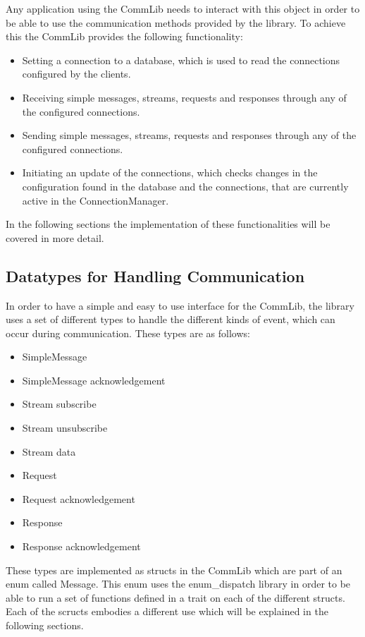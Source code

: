 Any application using the CommLib needs to interact with this object in order to be able to use the communication methods provided by the library. 
To achieve this the CommLib provides the following functionality:

\begin{itemize}
	\item Setting a connection to a database, which is used to read the connections configured by the clients.
	\item Receiving simple messages, streams, requests and responses through any of the configured connections.
	\item Sending simple messages, streams, requests and responses through any of the configured connections.
	\item Initiating an update of the connections, which checks changes in the configuration found in the database and the connections, that are currently active in the ConnectionManager.
\end{itemize}

In the following sections the implementation of these functionalities will be covered in more detail.

\subsection{Datatypes for Handling Communication}
In order to have a simple and easy to use interface for the CommLib, the library uses a set of different 
types to handle the different kinds of event, which can occur during communication. These types are
as follows:

\begin{itemize}
  \item SimpleMessage
  \item SimpleMessage acknowledgement
  \item Stream subscribe
  \item Stream unsubscribe
  \item Stream data
  \item Request
  \item Request acknowledgement
  \item Response
  \item Response acknowledgement
\end{itemize}

These types are implemented as structs in the CommLib which are part of an enum called Message. This enum uses the enum\_dispatch library
in order to be able to run a set of functions defined in a trait on each of the different structs. Each of the scructs embodies a different
use which will be explained in the following sections.


